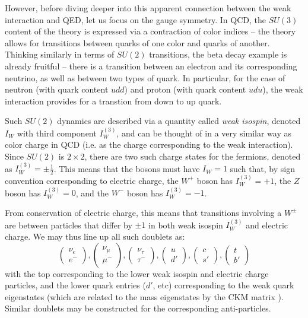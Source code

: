 However, before diving deeper into this apparent connection between the weak interaction and QED, let us focus on the
gauge symmetry. In QCD, the $SU(3)$ content of the theory is expressed via a contraction of color indices -- the theory 
allows for transitions between quarks of one color and quarks of another. Thinking similarly in terms of $SU(2)$ transitions,
the beta decay example is already fruitful -- there is a transition between an electron and its corresponding neutrino, 
as well as between two types of quark. In particular, for the case of neutron (with quark content $udd$) and proton 
(with quark content $udu$), the weak interaction provides for a transtion from down to up quark.

Such $SU(2)$ dynamics are described via a quantity called \emph{weak isospin}, denoted $I_{W}$ with third component 
$I_{W}^{(3)}$, and can be thought of in a very similar way as color charge in QCD (i.e. as the charge corresponding to the 
weak interaction). Since $SU(2)$ is $2 \times 2$, there are two such charge states for the fermions, denoted as 
$I_{W}^{(3)}=\pm \frac{1}{2}$. This means that the bosons must have $I_{W} = 1$ such that, by sign convention corresponding 
to electric charge, the $W^{+}$ boson has $I_{W}^{(3)}=+1$, the $Z$ boson has $I_{W}^{(3)}=0$, and the $W^{-}$ boson has
$I_{W}^{(3)}=-1$.

From conservation of electric charge, this means that transitions involving a $W^{\pm}$ are between particles that differ by
$\pm 1$ in both weak isospin $I_{W}^{(3)}$ and electric charge. We may thus line up all such doublets as: 
\begin{equation}
\begin{pmatrix}\nu_{e} \\ e^{-}\end{pmatrix}, \begin{pmatrix}\nu_{\mu} \\ \mu^{-}\end{pmatrix}, 
\begin{pmatrix}\nu_{\tau} \\ \tau^{-}\end{pmatrix}, \begin{pmatrix}u \\ d'\end{pmatrix}, 
\begin{pmatrix}c \\ s'\end{pmatrix}, \begin{pmatrix}t \\ b'\end{pmatrix}
\end{equation}
with the top corresponding to the lower weak isospin and electric charge particles, and the lower quark entries 
($d'$, etc) corresponding to the weak quark eigenstates (which are related to the mass eigenstates by the CKM 
matrix ). Similar doublets may be constructed for the corresponding anti-particles.

